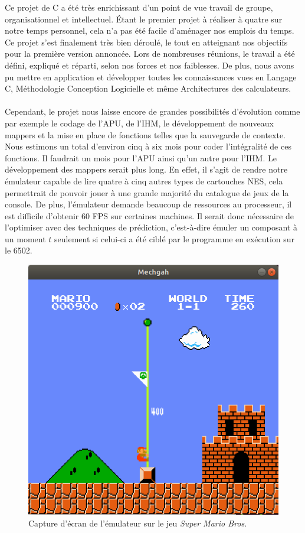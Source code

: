 Ce projet de C a été très enrichissant d'un point de vue travail de groupe, organisationnel et intellectuel. Étant le premier projet à réaliser à quatre sur notre temps personnel, cela n'a pas été facile d'aménager nos emplois du temps. Ce projet s'est finalement très bien déroulé, le tout en atteignant nos objectifs pour la première version annoncée. Lors de nombreuses réunions, le travail a été défini, expliqué et réparti, selon nos forces et nos faiblesses. De plus, nous avons pu mettre en application et développer toutes les connaissances vues en Langage C, Méthodologie Conception Logicielle et même Architectures des calculateurs.

\paragraph{}
 Cependant, le projet nous laisse encore de grandes possibilités d'évolution comme par exemple le codage de l'APU, de l'IHM, le développement de nouveaux mappers et la mise en place de fonctions telles que la sauvegarde de contexte. Nous estimons un total d'environ cinq à six mois pour coder l'intégralité de ces fonctions. Il faudrait un mois pour l'APU ainsi qu'un autre pour l'IHM. Le développement des mappers serait plus long. En effet, il s'agit de rendre notre émulateur capable de lire quatre à cinq autres types de cartouches NES, cela permettrait de pouvoir jouer à une grande majorité du catalogue de jeux de la console. De plus, l'émulateur demande beaucoup de ressources au processeur, il est difficile d'obtenir 60 FPS sur certaines machines. Il serait donc nécessaire de l'optimiser avec des techniques de prédiction, c'est-à-dire émuler un composant à un moment $t$ seulement si celui-ci a été ciblé par le programme en exécution sur le 6502.

\begin{figure}[H]
  \centering
   \includegraphics[width=0.50\linewidth]{images/smb_nes.png}
   \caption{Capture d'écran de l'émulateur sur le jeu \emph{Super Mario Bros.}}
   \label{fig:capture}
\end{figure}
